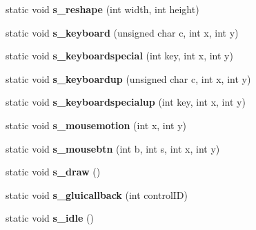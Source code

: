 \begin{DoxyCompactItemize}
\item 
\hypertarget{classBaseGfxApp_a2dd5556ffa87b331cdc650cddf4ee80b}{static void {\bfseries s\-\_\-reshape} (int width, int height)}\label{classBaseGfxApp_a2dd5556ffa87b331cdc650cddf4ee80b}

\item 
\hypertarget{classBaseGfxApp_a0b1317ca2ef686d0b4703de1e0b8dc2f}{static void {\bfseries s\-\_\-keyboard} (unsigned char c, int x, int y)}\label{classBaseGfxApp_a0b1317ca2ef686d0b4703de1e0b8dc2f}

\item 
\hypertarget{classBaseGfxApp_a4049c8e6296308837c36e20b15ff260b}{static void {\bfseries s\-\_\-keyboardspecial} (int key, int x, int y)}\label{classBaseGfxApp_a4049c8e6296308837c36e20b15ff260b}

\item 
\hypertarget{classBaseGfxApp_a1c78238c53f06781276519b8865c5c27}{static void {\bfseries s\-\_\-keyboardup} (unsigned char c, int x, int y)}\label{classBaseGfxApp_a1c78238c53f06781276519b8865c5c27}

\item 
\hypertarget{classBaseGfxApp_ab3756a0b2dea80d1dccc215384f611f4}{static void {\bfseries s\-\_\-keyboardspecialup} (int key, int x, int y)}\label{classBaseGfxApp_ab3756a0b2dea80d1dccc215384f611f4}

\item 
\hypertarget{classBaseGfxApp_a21da7f2b2e2905a24aa75caeb447e0f8}{static void {\bfseries s\-\_\-mousemotion} (int x, int y)}\label{classBaseGfxApp_a21da7f2b2e2905a24aa75caeb447e0f8}

\item 
\hypertarget{classBaseGfxApp_a6f32766519314c08dff47d2e4fed2072}{static void {\bfseries s\-\_\-mousebtn} (int b, int s, int x, int y)}\label{classBaseGfxApp_a6f32766519314c08dff47d2e4fed2072}

\item 
\hypertarget{classBaseGfxApp_a5e0a34041334caa5f9574a2357fc435b}{static void {\bfseries s\-\_\-draw} ()}\label{classBaseGfxApp_a5e0a34041334caa5f9574a2357fc435b}

\item 
\hypertarget{classBaseGfxApp_afd45ac8877eba24c7bf873b6b53af860}{static void {\bfseries s\-\_\-gluicallback} (int control\-I\-D)}\label{classBaseGfxApp_afd45ac8877eba24c7bf873b6b53af860}

\item 
\hypertarget{classBaseGfxApp_aabe2e037dbb7659c80113d54b5684873}{static void {\bfseries s\-\_\-idle} ()}\label{classBaseGfxApp_aabe2e037dbb7659c80113d54b5684873}

\end{DoxyCompactItemize}
